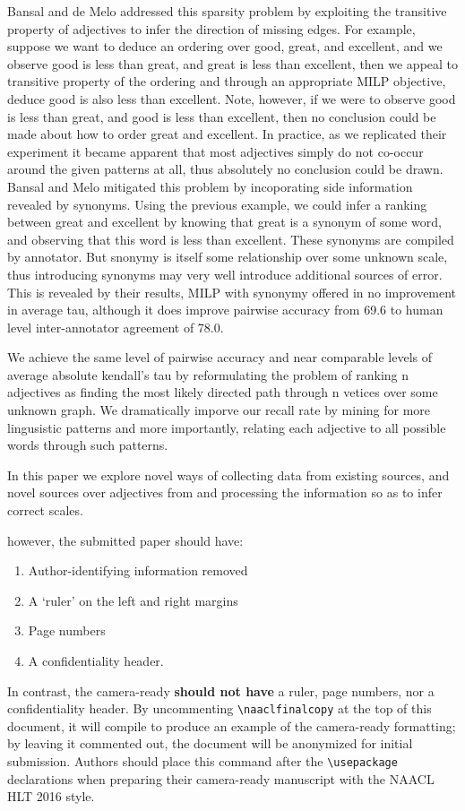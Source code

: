 \documentclass[11pt,letterpaper]{article}
\begin{document}
Bansal and de Melo addressed this sparsity problem by exploiting the transitive property of adjectives to infer the direction of missing edges. For example, suppose we want to deduce an ordering over good, great, and excellent, and we observe good is less than great, and great is less than excellent, then we appeal to transitive property of the ordering and through an appropriate MILP objective, deduce good is also less than excellent. Note, however, if we were to observe good is less than great, and good is less than excellent, then no conclusion could be made about how to order great and excellent. In practice, as we replicated their experiment it became apparent that most adjectives simply do not co-occur around the given patterns at all, thus absolutely no conclusion could be drawn. Bansal and Melo mitigated this problem by incoporating side information revealed by synonyms. Using the previous example, we could infer a ranking between great and excellent by knowing that great is a synonym of some word, and observing that this word is less than excellent. These synonyms are compiled by annotator. But snonymy is itself some relationship over some unknown scale, thus introducing synonyms may very well introduce additional sources of error. This is revealed by their results, MILP with synonymy offered in no improvement in average tau, although it does improve pairwise accuracy from 69.6 to human level inter-annotator agreement of 78.0. 

We achieve the same level of pairwise accuracy and near comparable levels of average absolute kendall's tau by reformulating the problem of ranking n adjectives as finding the most likely directed path through n vetices over some unknown graph. We dramatically imporve our recall rate by mining for more lingusistic patterns and more importantly, relating each adjective to all possible words through such patterns.



In this paper we explore novel ways of collecting data from existing sources, and novel sources over adjectives from and processing the information so as to infer correct scales. 

  however, the submitted paper should have:
\begin{enumerate} 
\item Author-identifying information removed
\item A `ruler' on the left and right margins
\item Page numbers 
\item A confidentiality header.  
\end{enumerate}
In contrast, the camera-ready {\bf should  not have} a ruler, page numbers, nor a confidentiality header.  By uncommenting {\small\verb|\naaclfinalcopy|} at the top of this 
 document, it will compile to produce an example of the camera-ready formatting; by leaving it commented out, the document will be anonymized for initial submission.  Authors should place this command after the {\small\verb|\usepackage|} declarations when preparing their camera-ready manuscript with the NAACL HLT 2016 style.
\end{document}
